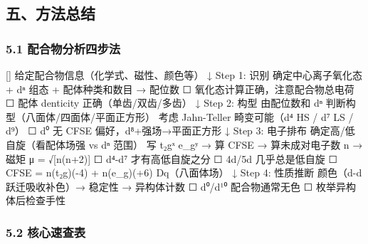 \documentclass[a4paper,11pt]{ctexart}
\newenvironment{Shaded}{}{}
\newenvironment{Highlighting}{}{}
\newcommand{\NormalTok}[1]{#1}
\newcommand{\箭}{\ensuremath{\rightarrow}}
\newcommand{\左箭}{\ensuremath{\leftarrow}}
\newcommand{\上箭}{\ensuremath{\uparrow}}
\newcommand{\下箭}{\ensuremath{\downarrow}}
\newcommand{\衡}{\ensuremath{\rightleftharpoons}}
\newcommand{\双箭}{\ensuremath{\leftrightarrow}}
\newcommand{\约等于}{\ensuremath{\approx}}
\newcommand{\小于等于}{\ensuremath{\leq}}
\newcommand{\大于等于}{\ensuremath{\geq}}
\newcommand{\不等于}{\ensuremath{\neq}}
\newcommand{\西格马}{\ensuremath{\sigma}}
\newcommand{\派}{\ensuremath{\pi}}
\begin{document}
\subsection{五、方法总结}\label{ux4e94ux65b9ux6cd5ux603bux7ed3}

\subsubsection{5.1 配合物分析四步法}\label{ux914dux5408ux7269ux5206ux6790ux56dbux6b65ux6cd5}

\begin{Shaded}
\begin{Highlighting}[]
\NormalTok{给定配合物信息（化学式、磁性、颜色等）}
\NormalTok{    ↓}
\NormalTok{Step 1: 识别}
\NormalTok{   确定中心离子氧化态 + dⁿ 组态 + 配体种类和数目 → 配位数}
\NormalTok{    ☐ 氧化态计算正确，注意配合物总电荷}
\NormalTok{    ☐ 配体 denticity 正确（单齿/双齿/多齿）}
\NormalTok{    ↓}
\NormalTok{Step 2: 构型}
\NormalTok{   由配位数和 dⁿ 判断构型（八面体/四面体/平面正方形）}
\NormalTok{   考虑 Jahn{-}Teller 畸变可能（d⁴ HS / d⁷ LS / d⁹）}
\NormalTok{    ☐ d⁰ 无 CFSE 偏好，d⁸+强场→平面正方形}
\NormalTok{    ↓}
\NormalTok{Step 3: 电子排布}
\NormalTok{   确定高/低自旋（看配体场强 vs dⁿ 范围）}
\NormalTok{   写 t₂gˣ e\_gʸ → 算 CFSE → 算未成对电子数 n → 磁矩 μ = √[n(n+2)]}
\NormalTok{    ☐ d⁴{-}d⁷ 才有高低自旋之分}
\NormalTok{    ☐ 4d/5d 几乎总是低自旋}
\NormalTok{    ☐ CFSE = n(t₂g)({-}4) + n(e\_g)(+6) Dq（八面体场）}
\NormalTok{    ↓}
\NormalTok{Step 4: 性质推断}
\NormalTok{   颜色（d{-}d 跃迁吸收补色）→ 稳定性 → 异构体计数}
\NormalTok{    ☐ d⁰/d¹⁰ 配合物通常无色}
\NormalTok{    ☐ 枚举异构体后检查手性}
\end{Highlighting}
\end{Shaded}

\subsubsection{5.2 核心速查表}\label{ux6838ux5fc3ux901fux67e5ux8868}
\end{document}
